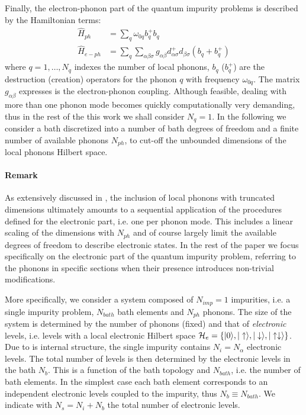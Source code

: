\documentclass[preprint,3p,10pt]{elsarticle}
\newcommand{\onlinecite}[1]{\nocite{#1}\hspace{-0.1cm}\citenum{#1}}
\newcommand{\ket}[1]
{|#1\rangle}
\def\a{\alpha}       \def\b{\beta}   \def\g{\gamma}   \def\d{\delta}
\def\up{\uparrow} \def\down{\downarrow} \def\dw{\downarrow}
\begin{document}
Finally, the electron-phonon part of the quantum impurity problems is
described by the Hamiltonian terms: 
\begin{equation}\label{Hph}
  \begin{split}
    \hat{H}_{ph}&=\sum_q \omega_{0q} b_q^+b_q\\
    \hat{H}_{e-ph} &= \sum_q\sum_{\a\b\sigma} g_{\a\b} d^+_{\a\sigma}d_{\b\sigma}(b_q+b_q^+)
\end{split}
\end{equation}
where $q=1,\dots,N_q$ indexes the number of local phonons, $b_q$
($b_q^+$) are the destruction (creation) operators for the phonon $q$
with frequency $\omega_{0q}$. The matrix  $g_{\a\b}$ expresses is the electron-phonon coupling. 
Although feasible, dealing with more than one phonon mode becomes
quickly computationally very demanding, thus in the rest of the this
work we shall consider $N_q=1$. 
In the following we consider a bath discretized into a  number
of bath degrees of freedom and a finite number of available phonons $N_{ph}$,
to cut-off the unbounded dimensions of the local phonons Hilbert space.


\paragraph{{\bf Remark}} As extensively discussed in
\onlinecite{amaricci2022}, the inclusion of local phonons with
truncated dimensions ultimately amounts to a sequential application of
the procedures defined for the electronic part, i.e. one per phonon
mode. This includes a linear scaling of the dimensions with $N_{ph}$
and of course largely limit the available degrees of freedom to
describe electronic states. In the rest of the paper we focus
specifically on the electronic part of the quantum impurity problem,
referring to the phonons in specific sections when their presence
introduces non-trivial modifications.  


More specifically, we consider a system composed of $N_{imp}=1$
impurities, i.e. a single impurity problem, $N_{bath}$ bath elements
and $N_{ph}$ phonons. The size of the system is determined by
the number of phonons (fixed) and that of {\it electronic} levels, i.e. levels with a local
electronic Hilbert space
$\HH_e=\{\ket{0},\ket{\up},\ket{\dw},\ket{\up\dw} \}$. 
Due to is internal structure, the single impurity contains
$N_i= N_\a$ electronic levels.
The total number of levels is then determined by
the electronic levels in the bath $N_b$. This is a function of the bath topology and $N_{bath}$,
i.e. the number of bath elements. In the simplest case each bath
element corresponds to an independent electronic levels coupled to the
impurity, thus $N_b\equiv N_{bath}$. 
We indicate with $N_s=N_i + N_b$ the total number of electronic levels. 
\end{document}
